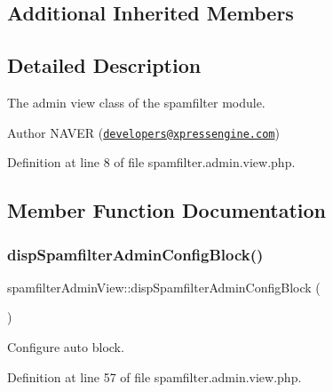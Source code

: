\subsection*{Additional Inherited Members}


\subsection{Detailed Description}
The admin view class of the spamfilter module. 

\begin{DoxyAuthor}{Author}
N\+A\+V\+ER (\href{mailto:developers@xpressengine.com}{\tt developers@xpressengine.\+com}) 
\end{DoxyAuthor}


Definition at line 8 of file spamfilter.\+admin.\+view.\+php.



\subsection{Member Function Documentation}
\mbox{\label{classspamfilterAdminView_a9619c9c4492158c50bb7d07d0bd4fb63}} 
\subsubsection{\texorpdfstring{disp\+Spamfilter\+Admin\+Config\+Block()}{dispSpamfilterAdminConfigBlock()}}
{\footnotesize\ttfamily spamfilter\+Admin\+View\+::disp\+Spamfilter\+Admin\+Config\+Block (\begin{DoxyParamCaption}{ }\end{DoxyParamCaption})}



Configure auto block. 



Definition at line 57 of file spamfilter.\+admin.\+view.\+php.

\mbox{\label{classspamfilterAdminView_ab568df0fe3a41960908ad05538d16335}} 
